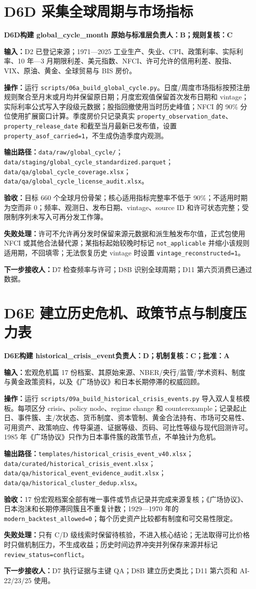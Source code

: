 \documentclass[UTF8,fontset=windows,12pt,openany]{ctexbook}
\newcommand{\Field}[1]{{\small\nolinkurl{#1}}}
\newcommand{\File}[1]{{\small\nolinkurl{#1}}}
\newcommand{\StepTitle}[3]{%
  \noindent\colorbox{DeepNavy}{\parbox{0.965\textwidth}{\color{white}\Large\bfseries #1\quad #2\hfill\normalsize #3}}\par\medskip
}
\newcommand{\CardRow}[2]{\noindent\textbf{#1：}#2\par}
\begin{document}
\newpage
\section{D6D 采集全球周期与市场指标}
\StepTitle{D6D}{构建 global\_cycle\_month 原始与标准层}{负责人：B；规则复核：C}
\CardRow{输入}{D2 已登记来源；1971—2025 工业生产、失业、CPI、政策利率、实际利率、10 年—3 月期限利差、美元指数、NFCI、许可允许的信用利差、股指、VIX、原油、黄金、全球贸易与 BIS 房价。}
\CardRow{操作}{运行 \File{scripts/06a_build_global_cycle.py}。日度/周度市场指标按预注册规则聚合至月末或月均并保留原日期；月度宏观值保留首次发布日期和 vintage；实际利率公式写入字段级元数据；股指回撤使用当时历史峰值；NFCI 的 90\% 分位使用扩展窗口计算。季度房价只记录真实 \Field{property_observation_date}、\Field{property_release_date} 和截至当月最新已发布值，设置 \Field{property_asof_carried=1}，不生成伪造季度内观测。}
\CardRow{输出路径}{\File{data/raw/global_cycle/}；\File{data/staging/global_cycle_standardized.parquet}；\File{data/qa/global_cycle_coverage.xlsx}；\File{data/qa/global_cycle_license_audit.xlsx}。}
\CardRow{验收}{目标 660 个全球月份骨架；核心适用指标完整率不低于 90\%；不适用时期为空而非 0；频率、观测日、发布日期、vintage、source ID 和许可状态完整；受限制序列未写入可再分发工作簿。}
\CardRow{失败处理}{许可不允许再分发时保留来源元数据和派生触发布尔值，正式包使用 NFCI 或其他合法替代源；某指标起始较晚时标记 \Field{not_applicable} 并缩小该规则适用期，不回填零；无法恢复历史 vintage 时设置 \Field{vintage_reconstructed=1}。}
\CardRow{下一步接收人}{D7 检查频率与许可；D8B 识别全球周期；D11 第六页消费已通过数据。}

\section{D6E 建立历史危机、政策节点与制度压力表}
\StepTitle{D6E}{构建 historical\_crisis\_event}{负责人：D；机制复核：C；批准：A}
\CardRow{输入}{宏观危机篇 17 份档案、其原始来源、NBER/央行/监管/学术资料、制度与黄金政策资料，以及《广场协议》和日本长期停滞的权威回顾。}
\CardRow{操作}{运行 \File{scripts/09a_build_historical_crisis_events.py} 导入双人复核模板。每项区分 crisis、policy node、regime change 和 counterexample；记录起止日、事件簇、主/次状态、货币制度、资本管制、黄金合法持有、市场可交易性、可用资产、政策响应、传导渠道、证据等级、页码、可比性等级与现代回测许可。1985 年《广场协议》只作为日本事件簇的政策节点，不单独计为危机。}
\CardRow{输出路径}{\File{templates/historical_crisis_event_v40.xlsx}；\File{data/curated/historical_crisis_event.xlsx}；\File{data/qa/historical_event_evidence_audit.xlsx}；\File{data/qa/historical_cluster_dedup.xlsx}。}
\CardRow{验收}{17 份宏观档案全部有唯一事件或节点记录并完成来源复核；《广场协议》、日本泡沫和长期停滞同簇且不重复计数；1929—1970 年的 \Field{modern_backtest_allowed=0}；每个历史资产比较都有制度和可交易性限定。}
\CardRow{失败处理}{只有 C/D 级线索时保留待核验，不进入核心结论；无法取得可比价格时只做机制压力，不生成收益；历史时间边界冲突并列保存来源并标记 \Field{review_status=conflict}。}
\CardRow{下一步接收人}{D7 执行证据与主键 QA；D8B 建立历史类比；D11 第六页和 AI-22/23/25 使用。}
\end{document}
